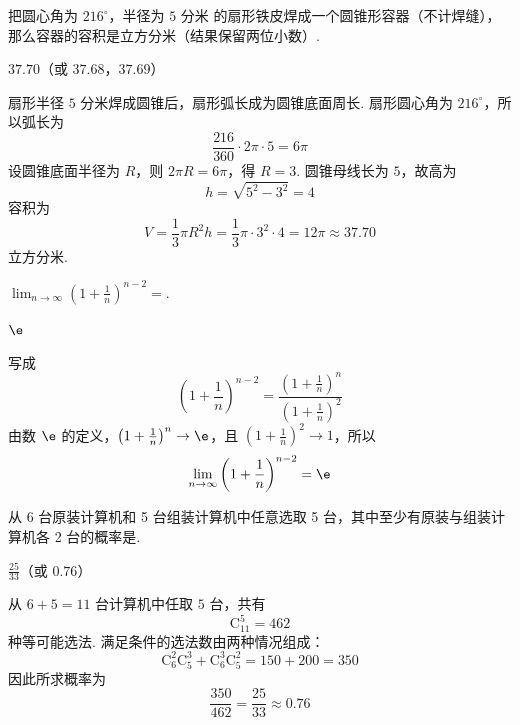 \begin{problem}[A]
把圆心角为 \(216^\circ\)，半径为 \(5\text{ 分米}\) 的扇形铁皮焊成一个圆锥形容器（不计焊缝），那么容器的容积是\fillinblank{}\(\text{立方分米}\)（结果保留两位小数）.
\end{problem}

\begin{answer}
\(37.70\)（或 \(37.68\)，\(37.69\)）
\end{answer}

\begin{solution}
扇形半径 \(5\) 分米焊成圆锥后，扇形弧长成为圆锥底面周长. 扇形圆心角为 \(216^\circ\)，所以弧长为
\[
\frac{216}{360}\cdot2\pi\cdot5=6\pi
\]
设圆锥底面半径为 \(R\)，则 \(2\pi R=6\pi\)，得 \(R=3\). 圆锥母线长为 \(5\)，故高为
\[
h=\sqrt{5^2-3^2}=4
\]
容积为
\[
V=\frac13\pi R^2h=\frac13\pi\cdot3^2\cdot4=12\pi\approx37.70
\]
立方分米.
\end{solution}

\setcounter{probnum}{17}
\begin{problem}[B]
\(\displaystyle\lim_{n\to\infty}\left(1+\frac{1}{n}\right)^{n-2}=\)\fillinblank{}.
\end{problem}

\begin{answer}
\(\e\)
\end{answer}

\begin{solution}
写成
\[
\left(1+\frac1n\right)^{n-2}
=\frac{\left(1+\frac1n\right)^n}{\left(1+\frac1n\right)^2}
\]
由数 \(\e\) 的定义，\(\left(1+\frac1n\right)^n\to\e\)，且 \(\left(1+\frac1n\right)^2\to1\)，所以
\[
\lim_{n\to\infty}\left(1+\frac1n\right)^{n-2}=\e
\]
\end{solution}

\begin{problem}[B]
从 6 台原装计算机和 5 台组装计算机中任意选取 5 台，其中至少有原装与组装计算机各 2 台的概率是\fillinblank{}.
\end{problem}

\begin{answer}
\(\frac{25}{33}\)（或 \(0.76\)）
\end{answer}

\begin{solution}
从 \(6+5=11\) 台计算机中任取 \(5\) 台，共有
\[
\mathrm C_{11}^5=462
\]
种等可能选法. 满足条件的选法数由两种情况组成：
\[
\mathrm C_6^2\mathrm C_5^3+\mathrm C_6^3\mathrm C_5^2
=150+200=350
\]
因此所求概率为
\[
\frac{350}{462}=\frac{25}{33}\approx0.76
\]
\end{solution}

